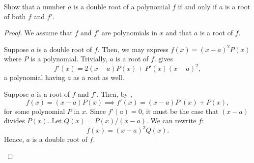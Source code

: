 \begin{problem}
  Show that a number $a$ is a double root of a polynomial $f$ if and only if $a$ is a root of both $f$ and $f'$.

  \begin{proof}
    We assume that $f$ and $f'$ are polynomials in $x$ and that $a$ is a root of $f$.
    \vspace{\baselineskip}

    \begin{forwardimplication}
      Suppose $a$ is a double root of $f$. Then, we may express $f(x) = (x - a)^{2}P(x)$ where $P$ is a polynomial.
      Trivially, $a$ is a root of $f$.  gives
      \[
        f'(x) = 2(x - a)P(x) + P'(x)(x - a)^{2},
      \]
      a polynomial having $a$ as a root as well.
    \end{forwardimplication}
    \vspace{\baselineskip}

    \begin{backwardimplication}
      Suppose $a$ is a root of $f$ and $f'$. Then, by ,
      \[
        f(x) = (x-a)P(x) \implies f'(x) = (x-a)P'(x) + P(x),
      \]
      for some polynomial $P$ in $x$.
      Since $f'(a) = 0$, it must be the case that $(x - a)$ divides $P(x)$. Let
      $Q(x) = P(x) / (x-a)$. We can rewrite $f$:
      \[
        f(x) = (x-a)^{2}Q(x).
      \]
      Hence, $a$ is a double root of $f$.
    \end{backwardimplication}
  \end{proof}
\end{problem}
